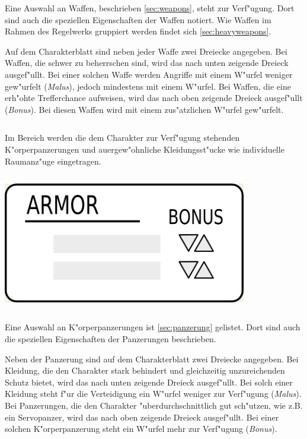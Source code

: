 Eine Auswahl an Waffen, beschrieben \cref{sec:weapons}, steht zur Verf"ugung. Dort sind auch die speziellen Eigenschaften der Waffen notiert. Wie Waffen im Rahmen des Regelwerks gruppiert werden findet sich \cref{sec:heavyweapons}.

Auf dem Charakterblatt sind neben jeder Waffe zwei Dreiecke angegeben. Bei Waffen, die schwer zu beherrschen sind, wird das nach unten zeigende Dreieck ausgef"ullt. Bei einer solchen Waffe werden Angriffe mit einem W"urfel weniger gew"urfelt (\emph{Malus}), jedoch mindestens mit einem W"urfel. Bei Waffen, die eine erh"ohte Trefferchance aufweisen, wird das nach oben zeigende Dreieck ausgef"ullt (\emph{Bonus}). Bei diesen Waffen wird mit einem zus"atzlichen W"urfel gew"urfelt.

\begin{column}[l]{0.55}
    Im Bereich  werden die dem Charakter zur Verf"ugung stehenden K"orperpanzerungen und au\3ergew"ohnliche Kleidungsst"ucke wie individuelle Raumanz"uge eingetragen.
\end{column}
\begin{column}[r]{0.45}
    \centering
    \includegraphics[width=0.80\textwidth]{images/character_armor.jpg}
\end{column}
\medskip

Eine Auswahl an K"orperpanzerungen ist \cref{sec:panzerung} gelistet. Dort sind auch die speziellen Eigenschaften der Panzerungen beschrieben.

Neben der Panzerung sind auf dem Charakterblatt zwei Dreiecke angegeben. Bei Kleidung, die den Charakter stark behindert und gleichzeitig unzureichenden Schutz bietet, wird das nach unten zeigende Dreieck ausgef"ullt. Bei solch einer Kleidung steht f"ur die Verteidigung ein W"urfel weniger zur Verf"ugung (\emph{Malus}). Bei Panzerungen, die den Charakter "uberdurchschnittlich gut sch"utzen, wie z.B. ein Servopanzer, wird das nach oben zeigende Dreieck ausgef"ullt. Bei einer solchen K"orperpanzerung steht ein W"urfel mehr zur Verf"ugung (\emph{Bonus}).

